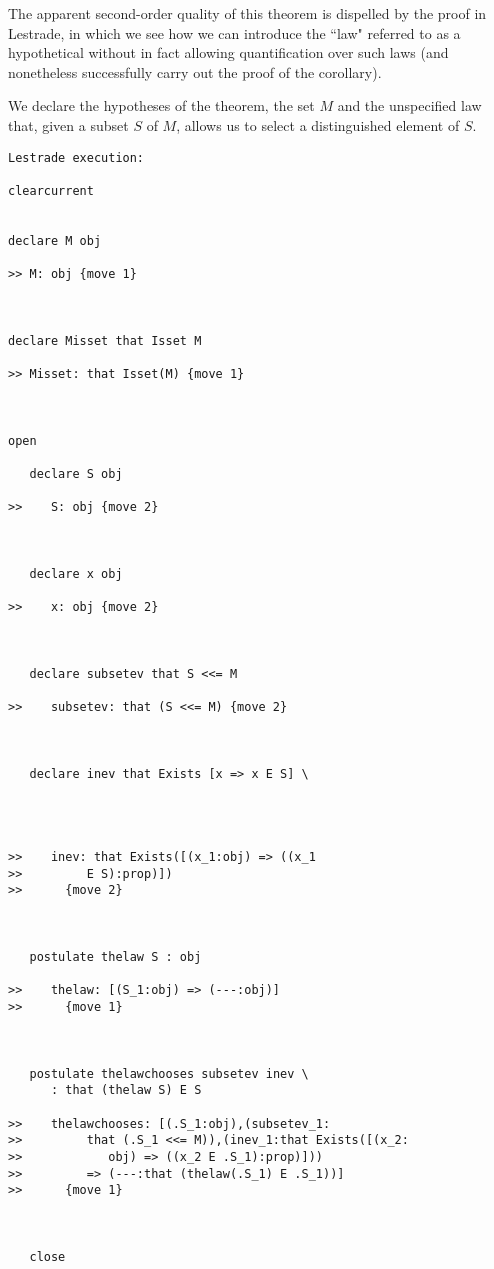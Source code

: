 \documentclass[12pt]{article}
\begin{document}
The apparent second-order quality of this theorem is dispelled by the proof in Lestrade, in which we see how we can introduce the ``law" referred to as a hypothetical without in fact allowing quantification over such laws (and nonetheless successfully carry out the proof of the corollary).



We declare the hypotheses of the theorem, the set $M$ and the unspecified law that, given a subset $S$ of $M$, allows us to select a distinguished element of $S$.

\begin{verbatim}Lestrade execution:

clearcurrent


declare M obj

>> M: obj {move 1}



declare Misset that Isset M

>> Misset: that Isset(M) {move 1}



open

   declare S obj

>>    S: obj {move 2}



   declare x obj

>>    x: obj {move 2}



   declare subsetev that S <<= M

>>    subsetev: that (S <<= M) {move 2}



   declare inev that Exists [x => x E S] \
      



>>    inev: that Exists([(x_1:obj) => ((x_1
>>         E S):prop)])
>>      {move 2}



   postulate thelaw S : obj

>>    thelaw: [(S_1:obj) => (---:obj)]
>>      {move 1}



   postulate thelawchooses subsetev inev \
      : that (thelaw S) E S

>>    thelawchooses: [(.S_1:obj),(subsetev_1:
>>         that (.S_1 <<= M)),(inev_1:that Exists([(x_2:
>>            obj) => ((x_2 E .S_1):prop)]))
>>         => (---:that (thelaw(.S_1) E .S_1))]
>>      {move 1}



   close
\end{verbatim}
\end{document}
